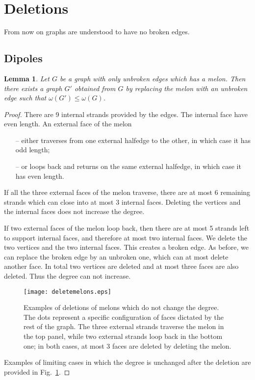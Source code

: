 \documentclass[10pt]{article}
\theoremstyle{plain}
\newtheorem{lemma}{Lemma}
\theoremstyle{definition}
\begin{document}
 
\newpage
 

\section{Deletions}
\label{sec:proof1}

From now on graphs are understood to have no broken edges.


\subsection{Dipoles}
 
\begin{lemma}\label{lem:melon}
 Let $G$ be a graph with only unbroken edges which has a melon. Then there exists a graph $G'$ obtained from $G$ by replacing the melon with an unbroken edge such that $\omega(G')\le \omega(G)$. 
\end{lemma}
\begin{proof}
 There are 9 internal strands provided by the edges. The internal face have even length. An external face of the melon
 \begin{itemize}
  \item[--] either traverses from one external halfedge to the other, in which case it has odd length;
  \item[--] or loops back and returns on the same external halfedge, in which case it has even length.
 \end{itemize}

 If all the three external faces of the melon traverse, there are at most 6 remaining strands which can close into at most 3 internal faces. Deleting the vertices and the internal faces does not increase the degree.
 
 If two external faces of the melon loop back, then there are at most 5 strands left to support internal faces, and therefore at most two internal faces. We delete the two vertices and the two internal faces.
 This creates a broken edge. As before, we can replace the broken edge by an unbroken one, which can at most delete another face. In total two vertices  are deleted and 
 at most three faces are also deleted. Thus the degree can not increase. 
 
\begin{figure}[htb]
 \begin{center}
 \texttt{[image: deletemelons.eps]}  
 \caption{Examples of deletions of melons which do not change the degree. The dots represent a specific configuration of faces
 dictated by the rest of the graph. The three external strands traverse the melon in the top panel, while two external strands loop 
 back in the bottom one; in both cases, at most 3 faces are deleted by deleting the melon.}\label{fig:deletemelons}
 \end{center}
 \end{figure}
 
  Examples of limiting cases in which the degree is unchanged after the deletion are provided in Fig.~\ref{fig:deletemelons}. 
  
\end{proof}
\end{document}
